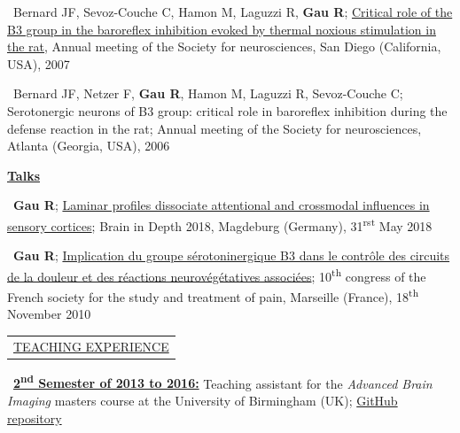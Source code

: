 \documentclass[a4paper,12pt,oneside]{letter}
\begin{document}
{\textbullet~Bernard JF, Sevoz-Couche C, Hamon M, Laguzzi R, \textbf{Gau R}; \href{https://osf.io/4rjst/}{Critical role of the B3 group in the baroreflex inhibition evoked by thermal noxious stimulation in the rat}, Annual meeting of the Society for neurosciences, San Diego (California, USA), 2007

\textbullet~Bernard JF, Netzer F, \textbf{Gau R}, Hamon M, Laguzzi R, Sevoz-Couche C; Serotonergic neurons of B3 group: critical role in baroreflex inhibition during the defense reaction in the rat; Annual meeting of the Society for neurosciences, Atlanta (Georgia, USA), 2006


\begin{center}
 \href{https://osf.io/4h63t/}{\large\textbf{Talks}}
\end{center}

\textbullet~\textbf{Gau R}; \href{https://figshare.com/s/06d360f8ec1be9431f6e}{Laminar profiles dissociate attentional and crossmodal influences in sensory cortices}; Brain in Depth 2018, Magdeburg (Germany), 31\textsuperscript{rst} May 2018

\textbullet~\textbf{Gau R}; \href{http://www.researchgate.net/profile/Remi_Gau/publication/312084405_Implication_du_groupe_serotoninergique_B3_dans_le_controle_des_circuits_de_la_douleur_et_des_reactions_neurovegetatives_associees/links/586e5f4a08ae6eb871bcfcc2?origin=publication_detail&ev=pub_int_prw_xdl&msrp=fq7qspniFbcYB53CbrroAtz2DNXxUJar7CmckJaw6O2YzI7LWasFAW99t9G74Z5sL-KLoJT2Dqv8D075R3ghy55Fy6xPne3_ARZvM87O3Ao.5ii75N_9y4vKCns-VUuTTDNhKb6ruhYALqaObgtdOB4WIkUSArh9tdzN9AtPRWz68YGcjTb3scxfWZy6tYxnSg.naSDUCbUZHM6gF6BaFbjpF3ARcyIPTBh1UsuA1cVoOZQsoPMn9YGNC2UsgdGA0P28xoO8bXY1221-tRVtfrUZA}{Implication du groupe sérotoninergique B3 dans le contrôle des circuits de la douleur et des réactions neurovégétatives associées}; 10\textsuperscript{th} congress of the French society for the study and treatment of pain, Marseille (France), 18\textsuperscript{th} November 2010


\medskip 

\begin{tabular}{B}
 \underline{TEACHING EXPERIENCE}
\end{tabular}

\textbullet~\underline{\textbf{2\textsuperscript{nd} Semester of 2013 to 2016:}} 	Teaching assistant for the \textit{Advanced Brain Imaging} masters course at the University of Birmingham (UK); \href{https://github.com/Remi-Gau/advanced_fMRI_course}{GitHub repository}

}
\end{document}
